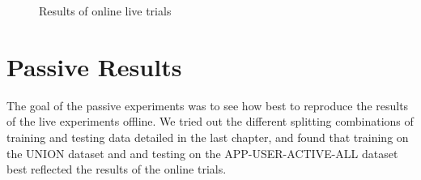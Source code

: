 \begin{figure}[h!]
\centering
{}
\caption{Results of online live trials}
\end{figure}

\section {Passive Results}

The goal of the passive experiments was to see how best to reproduce the results of the live experiments offline. We tried out the different splitting combinations of training and testing data detailed in the last chapter, and found that training on the UNION dataset and and testing on the APP-USER-ACTIVE-ALL dataset best reflected the results of the online trials.

